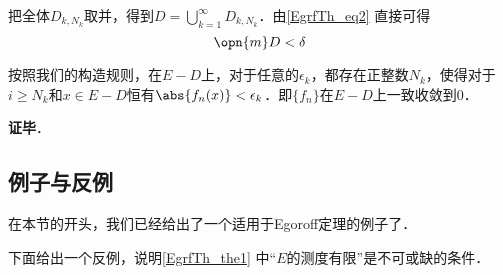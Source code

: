 把全体$D_{k, N_k}$取并，得到$D=\bigcup_{k=1}^\infty D_{k, N_k}$．由\autoref{EgrfTh_eq2} 直接可得
\begin{equation}
\opn{m}D<\delta
\end{equation}

按照我们的构造规则，在$E-D$上，对于任意的$\epsilon_k$，都存在正整数$N_k$，使得对于$i\geq N_k$和$x\in E-D$恒有$\abs{f_n(x)}<\epsilon_k$．即$\{f_n\}$在$E-D$上一致收敛到$0$．

\textbf{证毕}．


\subsection{例子与反例}

在本节的开头，我们已经给出了一个适用于Egoroff定理的例子了．

下面给出一个反例，说明\autoref{EgrfTh_the1} 中“$E$的测度有限”是不可或缺的条件．







